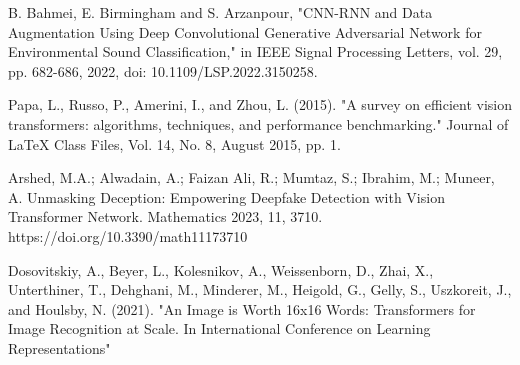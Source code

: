 \begin{thebibliography}{99}
    \item\label{ref9} B. Bahmei, E. Birmingham and S. Arzanpour, "CNN-RNN and Data Augmentation Using Deep Convolutional Generative Adversarial Network for Environmental Sound Classification," in IEEE Signal Processing Letters, vol. 29, pp. 682-686, 2022, doi: 10.1109/LSP.2022.3150258.

    \item\label{ref10} Papa, L., Russo, P., Amerini, I., and Zhou, L. (2015). "A survey on efficient vision transformers: algorithms, techniques, and performance benchmarking." Journal of LaTeX Class Files, Vol. 14, No. 8, August 2015, pp. 1.
    
    \item\label{ref11} Arshed, M.A.; Alwadain, A.; Faizan Ali, R.; Mumtaz, S.; Ibrahim, M.; Muneer, A. Unmasking Deception: Empowering Deepfake Detection with Vision Transformer Network. Mathematics 2023, 11, 3710. https://doi.org/10.3390/math11173710
    \item\label{ref12} Dosovitskiy, A., Beyer, L., Kolesnikov, A., Weissenborn, D., Zhai, X., Unterthiner, T., Dehghani, M., Minderer, M., Heigold, G., Gelly, S., Uszkoreit, J., and Houlsby, N. (2021). "An Image is Worth 16x16 Words: Transformers for Image Recognition at Scale. In International Conference on Learning Representations"
\end{thebibliography}
